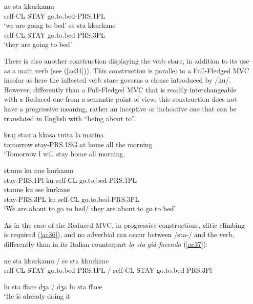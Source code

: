 \documentclass[output=paper]{langscibook}
\begin{document}
\ea\label{ac33}
    \ea\label{ac33a} \gll  ne   sta   kkurkamu \\ 
    self-CL  STAY   go.to.bed-PRS.1PL\\
  \glt ‘we are going to bed’
    \ex\label{ac33b} \gll se    sta   kkurkane\\
   self-CL  STAY go.to.bed-PRS.3PL\\
     \glt ‘they are going to bed’
 \z
\z

There is also another construction displaying the verb stare, in addition to its use as a main verb (see (\ref{ac34})). This construction is parallel to a Full-Fledged MVC insofar as here the inflected verb stare governs a clause introduced by /ku/. However, differently than a Full-Fledged MVC that is readily interchangeable with a Reduced one from a semantic point of view, this construction does not have a progressive meaning, rather an inceptive or inchoative one that can be translated in English with “being about to”.

\ea \label{ac34}\gll kraj      stau       a  kkasa  tutta  la  matina\\
    tomorrow   stay-PRS.1SG at home all   the  morning\\
 \glt ‘Tomorrow I will stay home all morning.
\z

\ea\label{ac35}
    \ea \label{ac35a}\gll stamu      ku  nne     kurkamu\\
    stay-PRS.1Pl ku self-CL  go.to.bed-PRS.1PL\\ 
    \ex \label{ac35b}\gll staune      ku  sse     kurkane\\
    stay-PRS.3PL ku self-CL  go.to.bed-PRS.3PL\\
    \glt ‘We are about to go to bed/ they are about to go to bed’
    \z
\z

As in the case of the Reduced MVC, in progressive constructions, clitic climbing is required (\ref{ac36}), and no adverbial can occur between /sta-/ and the verb, differently than in its Italian counterpart \textit{lo sta già facendo} (\ref{ac37}):

\ea\label{ac36}
    \ea\label{ac36a} \gll ne   sta     kkurkamu    /  se    sta   kkurkane\\
    self-CL  STAY go.to.bed-PRS.1PL / self-CL STAY go.to.bed-PRS.3Pl\\
    \z
\z

\ea\label{ac37}
    \ex \label{ac37b}lu sta fface dʒa / dʒa lu sta fface\\
     ‘He is already doing it
    \z
\z
\end{document}
